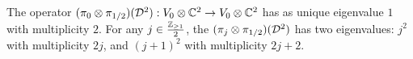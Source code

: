 \begin{lemma}\label{lemmaSpectrumAlgebraic}
The operator $(\pi_0 \otimes \pi_{1/2})(\mathcal D^2): V_0 \otimes \mathbb{C}^2 \to V_0 \otimes \mathbb{C}^2$ has as unique eigenvalue $1$ with multiplicity $2$. For any $j \in \frac{\mathbb{Z}_{\geq 1}}{2}$, the $(\pi_j \otimes \pi_{1/2})(\mathcal D^2)$ has two eigenvalues: $j^2$ with multiplicity $2j$, and $(j+1)^2$ with multiplicity $2j+2$.
\end{lemma}






